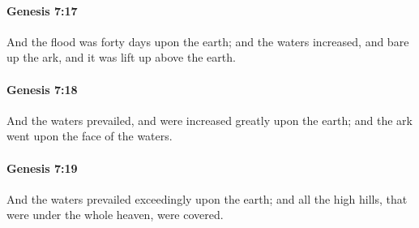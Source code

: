 		\paragraph{Genesis 7:17} %
			\label{GENESIS-7-17}

			And the flood was forty days upon the earth; and the waters increased, and bare up the ark, and it was lift up above the earth.


		\paragraph{Genesis 7:18} %
			\label{GENESIS-7-18}

			And the waters prevailed, and were increased greatly upon the earth; and the ark went upon the face of the waters.


		\paragraph{Genesis 7:19} %
			\label{GENESIS-7-19}

			And the waters prevailed exceedingly upon the earth; and all the high hills, that were under the whole heaven, were covered.


